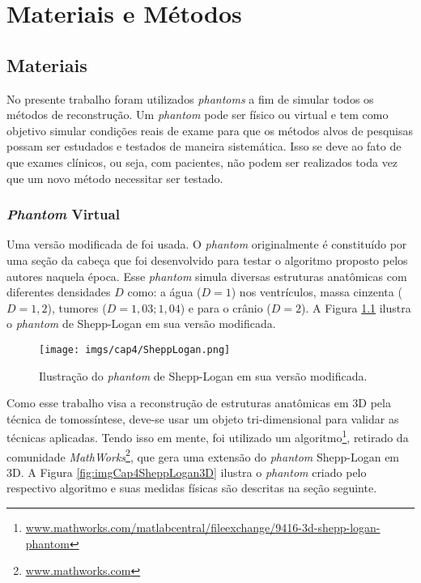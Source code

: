 \chapter[Materiais e Métodos]{Materiais e Métodos}\label{Capitulo4}
 

\section{Materiais}

No presente trabalho foram utilizados \textit{phantoms} a fim de simular todos os métodos de reconstrução. Um \textit{phantom} pode ser físico ou virtual e tem como objetivo simular condições reais de exame para que os métodos alvos de pesquisas possam ser estudados e testados de maneira sistemática. Isso se deve ao fato de que exames clínicos, ou seja, com pacientes, não podem ser realizados toda vez que um novo método necessitar ser testado.

\subsection{\textit{Phantom} Virtual}

Uma versão modificada de  foi usada. O \textit{phantom} originalmente é constituído por uma seção da cabeça que foi desenvolvido para testar o algoritmo proposto pelos autores naquela época. Esse \textit{phantom} simula diversas estruturas anatômicas com diferentes densidades $D$ como: a água ($D=1$) nos ventrículos, massa cinzenta ($D=1,2$), tumores ($D=1,03;1,04$) e para o crânio ($D=2$). A Figura \ref{fig:imgCap4SheppLogan} ilustra o \textit{phantom} de Shepp-Logan em sua versão modificada.

\begin{figure}[H]
	\caption{Ilustração do \textit{phantom} de Shepp-Logan em sua versão modificada.}
	\begin{center}
		\texttt{[image: imgs/cap4/SheppLogan.png]}
	\end{center}
	\label{fig:imgCap4SheppLogan}
\end{figure}   

Como esse trabalho visa a reconstrução de estruturas anatômicas em \acs{3D} pela técnica de tomossíntese, deve-se usar um objeto tri-dimensional para validar as técnicas aplicadas. Tendo isso em mente, foi utilizado um algoritmo\footnote{\url{www.mathworks.com/matlabcentral/fileexchange/9416-3d-shepp-logan-phantom}}, retirado da comunidade \textit{MathWorks}\footnote{\url{www.mathworks.com}}, que gera uma extensão do \textit{phantom} Shepp-Logan em \acs{3D}. A Figura \ref{fig:imgCap4SheppLogan3D} ilustra o \textit{phantom} criado pelo respectivo algoritmo e suas medidas físicas são descritas na seção seguinte.

